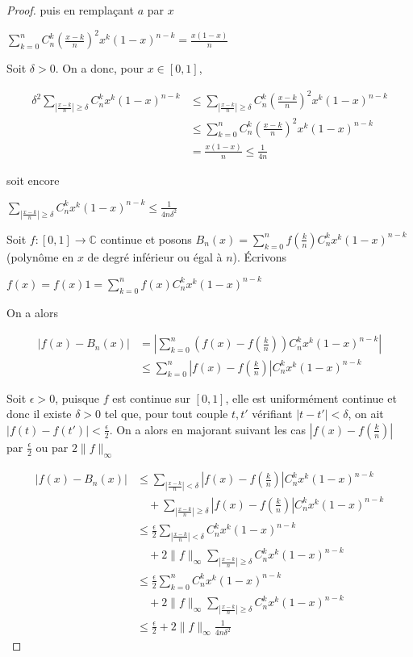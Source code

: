 \begin{proof}
puis en remplaçant $a$ par $x$

$\sum_{k=0}^n C_n^k \left(\frac{x - k}{n}\right)^2 x^k (1 - x)^{n-k} = \frac{x(1 - x)}{n}$

Soit $\delta > 0$. On a donc, pour $x \in [0,1]$,

\begin{align*}
\delta^2 \sum_{|\frac{x - k}{n}| \geq \delta} C_n^k x^k (1 - x)^{n-k} &\leq \sum_{|\frac{x - k}{n}| \geq \delta} C_n^k \left(\frac{x - k}{n}\right)^2 x^k (1 - x)^{n-k} \\
&\leq \sum_{k=0}^n C_n^k \left(\frac{x - k}{n}\right)^2 x^k (1 - x)^{n-k} \\
&= \frac{x(1 - x)}{n} \leq \frac{1}{4n}
\end{align*}

soit encore

$\sum_{|\frac{x - k}{n}| \geq \delta} C_n^k x^k (1 - x)^{n-k} \leq \frac{1}{4n\delta^2}$

Soit $f : [0,1] \to \mathbb{C}$ continue et posons $B_n(x) = \sum_{k=0}^n f(\frac{k}{n}) C_n^k x^k (1 - x)^{n-k}$ (polynôme en $x$ de degré inférieur ou égal à $n$). Écrivons

$f(x) = f(x) 1 = \sum_{k=0}^n f(x) C_n^k x^k (1 - x)^{n-k}$

On a alors

\begin{align*}
|f(x) - B_n(x)| &= \left|\sum_{k=0}^n (f(x) - f(\frac{k}{n})) C_n^k x^k (1 - x)^{n-k}\right| \\
&\leq \sum_{k=0}^n \left|f(x) - f(\frac{k}{n})\right| C_n^k x^k (1 - x)^{n-k}
\end{align*}

Soit $\epsilon > 0$, puisque $f$ est continue sur $[0,1]$, elle est uniformément continue et donc il existe $\delta > 0$ tel que, pour tout couple $t,t'$ vérifiant $|t - t'| < \delta$, on ait $|f(t) - f(t')| < \frac{\epsilon}{2}$. On a alors en majorant suivant les cas $\left|f(x) - f(\frac{k}{n})\right|$ par $\frac{\epsilon}{2}$ ou par $2\|f\|_\infty$

\begin{align*}
|f(x) - B_n(x)| &\leq \sum_{|\frac{x - k}{n}| < \delta} \left|f(x) - f(\frac{k}{n})\right| C_n^k x^k (1 - x)^{n-k} \\
&\quad + \sum_{|\frac{x - k}{n}| \geq \delta} \left|f(x) - f(\frac{k}{n})\right| C_n^k x^k (1 - x)^{n-k} \\
&\leq \frac{\epsilon}{2} \sum_{|\frac{x - k}{n}| < \delta} C_n^k x^k (1 - x)^{n-k} \\
&\quad + 2\|f\|_\infty \sum_{|\frac{x - k}{n}| \geq \delta} C_n^k x^k (1 - x)^{n-k} \\
&\leq \frac{\epsilon}{2} \sum_{k=0}^n C_n^k x^k (1 - x)^{n-k} \\
&\quad + 2\|f\|_\infty \sum_{|\frac{x - k}{n}| \geq \delta} C_n^k x^k (1 - x)^{n-k} \\
&\leq \frac{\epsilon}{2} + 2\|f\|_\infty \frac{1}{4n\delta^2}
\end{align*}


\end{proof}
